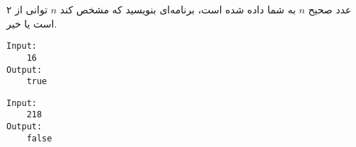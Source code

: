 
عدد صحیح $n$ به شما داده شده است، برنامه‌ای بنویسید که مشخص کند $n$ توانی از ۲ است یا خیر.

\begin{latin}
\begin{verbatim}
Input:
    16
Output:
    true
\end{verbatim}
\end{latin}

\begin{latin}
\begin{verbatim}
Input:
    218
Output:
    false
\end{verbatim}
\end{latin}
